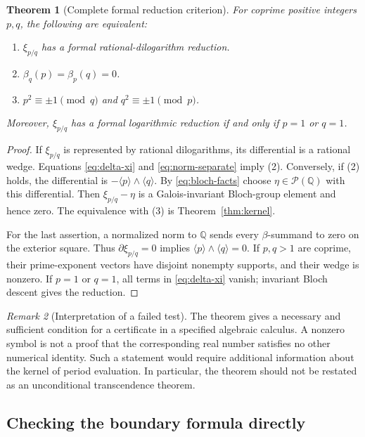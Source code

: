 \documentclass[11pt]{article}
\numberwithin{equation}{section}
\newtheorem{theorem}{Theorem}[section]
\theoremstyle{definition}
\theoremstyle{remark}
\newtheorem{remark}[theorem]{Remark}
\newcommand{\Q}{\mathbb Q}
\newcommand{\Pcal}{\mathcal P}
\newcommand{\cl}[1]{\langle #1\rangle}
\begin{document}
\begin{theorem}[Complete formal reduction criterion]\label{thm:reduction}
For coprime positive integers $p,q$, the following are equivalent:
\begin{enumerate}
\item $\xi_{p/q}$ has a formal rational-dilogarithm reduction.
\item $\beta_q(p)=\beta_p(q)=0$.
\item $p^2\equiv\pm1\pmod q$ and $q^2\equiv\pm1\pmod p$.
\end{enumerate}
Moreover, $\xi_{p/q}$ has a formal logarithmic reduction if and only if
$p=1$ or $q=1$.
\end{theorem}
\begin{proof}
If $\xi_{p/q}$ is represented by rational dilogarithms, its differential
is a rational wedge. Equations \eqref{eq:delta-xi} and
\eqref{eq:norm-separate} imply (2). Conversely, if (2) holds, the
differential is $-\cl p\wedge\cl q$. By \eqref{eq:bloch-facts} choose
$\eta\in\Pcal(\Q)$ with this differential. Then
$\xi_{p/q}-\eta$ is a Galois-invariant Bloch-group element and hence
zero. The equivalence with (3) is Theorem~\ref{thm:kernel}.

For the last assertion, a normalized norm to $\Q$ sends every
$\beta$-summand to zero on the exterior square. Thus
$\partial\xi_{p/q}=0$ implies $\cl p\wedge\cl q=0$. If $p,q>1$
are coprime, their prime-exponent vectors have disjoint nonempty supports,
and their wedge is nonzero. If $p=1$ or $q=1$, all terms in
\eqref{eq:delta-xi} vanish; invariant Bloch descent gives the reduction.
\end{proof}

\begin{remark}[Interpretation of a failed test]
The theorem gives a necessary and sufficient condition for a certificate
in a specified algebraic calculus. A nonzero symbol is not a proof that
the corresponding real number satisfies no other numerical identity.
Such a statement would require additional information about the kernel
of period evaluation. In particular, the theorem should not be restated
as an unconditional transcendence theorem.
\end{remark}

\subsection{Checking the boundary formula directly}
\end{document}
